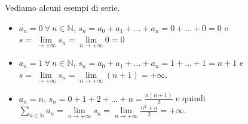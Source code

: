 \begin{example}
Vediamo alcuni esempi di serie.
\begin{itemize}
    \item $a_n = 0 \: \forall \: n \in \mathbb{N}$, $s_n = a_0 + a_1 + ... + a_n = 0 + ... + 0 = 0$ e $s = \lim\limits_{\to +\infty}s_n = \lim\limits_{n\to +\infty}0 = 0$
    \item $a_n = 1 \: \forall \: n \in \mathbb{N}$, $s_n = a_0 + a_1 + ... + a_n = 1 + ... + 1 = n+1$ e $ s = \lim\limits_{\to +\infty}s_n = \lim\limits_{n\to +\infty}(n+1) = +\infty$.
    \item $a_n = n$, $s_n = 0 + 1 + 2 + ... + n = \frac{n(n+1)}{2}$ e quindi $\sum\limits_{n\in \mathbb{N}}a_n = \lim\limits_{n\to +\infty}s_n = \lim\limits_{n\to + \infty}\frac{n^2 + n}{2} = +\infty$.
\end{itemize}
\end{example}

